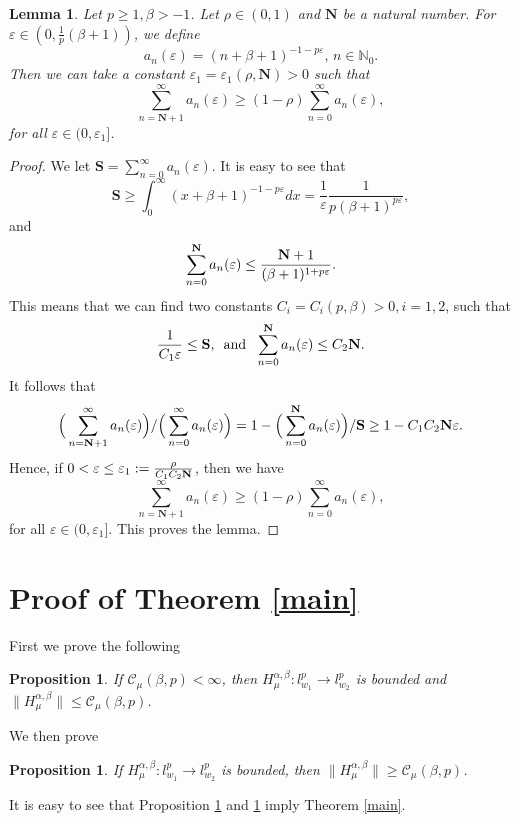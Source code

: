 \documentclass[10pt]{amsart}
\newtheorem{proposition}[theorem]{Proposition}
\newtheorem{lemma}[theorem]{Lemma}
\theoremstyle{definition}
\theoremstyle{question}
\numberwithin{equation}{section}
\begin{document}
\begin{lemma}\label{l-6}
Let $p\geq 1, \beta>-1$. Let $\rho\in (0,1)$ and $\mathbf{N}$ be a natural number. For $\varepsilon\in (0, \frac{1}{p}(\beta+1))$, we define $$a_n(\varepsilon)=(n+\beta+1)^{-1-p\varepsilon},\, n\in \mathbb{N}_0.$$ 
Then we can take a constant $\varepsilon_1=\varepsilon_1(\rho, \mathbf{N})>0$ such that
$$\sum_{n=\mathbf{N}+1}^{\infty}a_n(\varepsilon)\geq (1-\rho)\sum_{n=0}^{\infty}a_n(\varepsilon),$$
for all $\varepsilon\in (0, \varepsilon_1]$. 
\end{lemma}

\begin{proof}
We let $\mathbf{S}=\sum_{n=0}^{\infty}a_n(\varepsilon)$. It is easy to see that
\begin{equation}
\mathbf{S}\geq \int_{0}^{\infty}(x+\beta+1)^{-1-p\varepsilon}dx=\frac{1}{\varepsilon} \frac{1}{p(\beta+1)^{p\varepsilon}}, \nonumber\end{equation}
and \begin{equation}
\sum_{n=0}^{\bf{N}}a_n(\varepsilon)\leq \frac{{\bf{N}}+1}{(\beta+1)^{1+p\varepsilon}}. \nonumber
\end{equation}
This means that we can find two constants $C_i=C_i(p,\beta)>0, i=1,2$, such that
$$\frac{1}{C_1\varepsilon}\leq \mathbf{S},\,\,\,{\text{and}}\,\,\,\, \sum_{n=0}^{\bf{N}}a_n(\varepsilon)\leq C_2{\bf{N}}.$$
It follows that
\begin{equation} 
\Big(\sum_{n={\bf{N}}+1}^{\infty}a_n(\varepsilon)\Big)/\Big(\sum_{n=0}^{\infty}a_n(\varepsilon)\Big)=1-\Big(\sum_{n=0}^{\bf{N}}a_n(\varepsilon)\Big)/\mathbf{S}\geq 1-C_1 C_2{\bf{N}}\varepsilon. \nonumber 
\end{equation}
Hence, if $0<\varepsilon\leq \varepsilon_1:=\frac{\rho}{C_1C_2{\bf{N}}}$, then we have
$$\sum_{n=\mathbf{N}+1}^{\infty}a_n(\varepsilon)\geq (1-\rho)\sum_{n=0}^{\infty}a_n(\varepsilon),$$
for all $\varepsilon\in (0,\varepsilon_1]$. This proves the lemma. 
\end{proof}


\section{{\bf Proof of Theorem \ref{main}}}
First we prove the following
\begin{proposition}\label{i}
If $\mathcal{C}_{\mu}(\beta,p)<\infty$, then $H_{\mu}^{\alpha, \beta}: l_{w_1}^{p}\rightarrow l_{w_2}^p$ is bounded and $\|H_{\mu}^{\alpha, \beta}\|\leq \mathcal{C}_{\mu}(\beta,p)$.  
\end{proposition}
We then prove 
\begin{proposition}\label{ii} 
If $H_{\mu}^{\alpha, \beta}: l_{w_1}^{p}\rightarrow l_{w_2}^p$ is bounded, then $\|H_{\mu}^{\alpha, \beta}\|\geq \mathcal{C}_{\mu}(\beta,p)$.\end{proposition}
It is easy to see that Proposition \ref{i} and \ref{ii} imply Theorem \ref{main}. 
\end{document}
